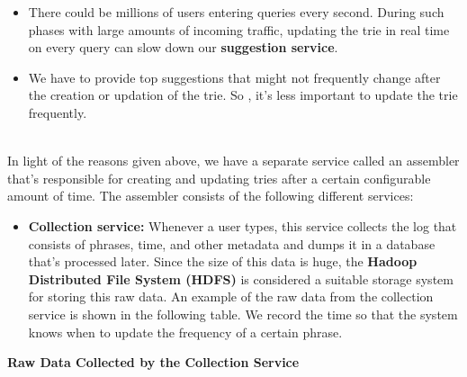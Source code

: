 \begin{itemize}
\item
\protect{}\label{PTv6aTCsTCyFFj7WOWS5Z}
There could be millions of users entering queries every second. During such phases with large amounts of incoming traffic, updating the trie in real time on every query can slow down our \textbf{suggestion service}.
\item
\protect{}\label{vE4yana_NYVHAB9bgkiYc}
We have to provide top suggestions that might not frequently change after the creation or updation of the trie. So , it's less important to update the trie frequently.
\end{itemize}
\\
In light of the reasons given above, we have a separate service called an assembler that's responsible for creating and updating tries after a certain configurable amount of time. The assembler consists of the following different services:

\begin{itemize}
\item
\protect{}\label{RZmVbS3JZ3oApyFFYE7Ie}
\textbf{Collection service:} Whenever a user types, this service collects the log that consists of phrases, time, and other metadata and dumps it in a database that's processed later. Since the size of this data is huge, the \textbf{Hadoop Distributed File System (HDFS)} is considered a suitable storage system for storing this raw data. An example of the raw data from the collection service is shown in the following table. We record the time so that the system knows when to update the frequency of a certain phrase.
\end{itemize}

\textbf{Raw Data Collected by the Collection Service}

\begin{table}[htbp]
\centering
\small
{}
\caption{Raw Data Collected by the Collection Service}
\end{table}

